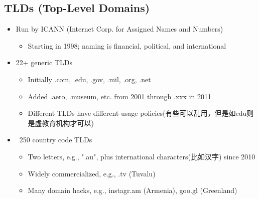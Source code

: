 \documentclass[12pt]{ctexart}   %
\begin{document}
	 \subsection{TLDs (Top-Level Domains)}
	 \begin{itemize}
	 	\item Run by ICANN (Internet Corp. for Assigned Names and Numbers)
	 	\begin{itemize}
	 		\item Starting in 1998; naming is financial, political, and international
	 	\end{itemize}
	 	
	 	\item 22+ generic TLDs
	 	\begin{itemize}
	 		\item Initially .com, .edu, .gov, .mil, .org, .net
	 		\item Added .aero, .museum, etc. from 2001 through .xxx in 2011
	 		\item Different TLDs have different usage policies(有些可以乱用，但是如edu则是虚教育机构才可以)
	 	\end{itemize}
	 	
	 	\item ~250 country code TLDs
	 	\begin{itemize}
	 		\item Two letters, e.g., ".au", plus international characters(比如汉字) since 2010
	 		\item Widely commercialized, e.g., .tv (Tuvalu)
	 		\item Many domain hacks, e.g., instagr.am (Armenia), goo.gl (Greenland)
	 	\end{itemize}
	 \end{itemize}
	 
\end{document}
